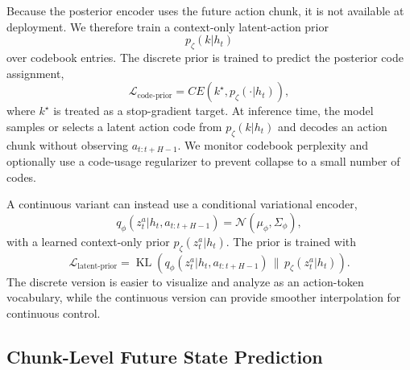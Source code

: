 \documentclass[10pt]{article}
\newcommand{\KL}{\operatorname{KL}}
\begin{document}
Because the posterior encoder uses the future action chunk, it is not available at deployment. We therefore train a context-only latent-action prior
\begin{equation}
 p_\zeta(k|h_t)
 \label{eq:code_prior}
\end{equation}
over codebook entries. The discrete prior is trained to predict the posterior code assignment,
\begin{equation}
\mathcal{L}_{\mathrm{code\mbox{-}prior}}=CE(k^\star,p_\zeta(\cdot|h_t)),
\label{eq:code_prior_loss}
\end{equation}
where $k^\star$ is treated as a stop-gradient target. At inference time, the model samples or selects a latent action code from $p_\zeta(k|h_t)$ and decodes an action chunk without observing $a_{t:t+H-1}$. We monitor codebook perplexity and optionally use a code-usage regularizer to prevent collapse to a small number of codes.

A continuous variant can instead use a conditional variational encoder,
\begin{equation}
q_\phi(z_t^a|h_t,a_{t:t+H-1})=\mathcal{N}(\mu_\phi,\Sigma_\phi),
\label{eq:continuous_latent}
\end{equation}
with a learned context-only prior $p_\zeta(z_t^a|h_t)$. The prior is trained with
\begin{equation}
\mathcal{L}_{\mathrm{latent\mbox{-}prior}}=
\KL\left(q_\phi(z_t^a|h_t,a_{t:t+H-1})\,\|\,p_\zeta(z_t^a|h_t)\right).
\label{eq:latent_prior_loss}
\end{equation}
The discrete version is easier to visualize and analyze as an action-token vocabulary, while the continuous version can provide smoother interpolation for continuous control.

\subsection{Chunk-Level Future State Prediction}
\end{document}
